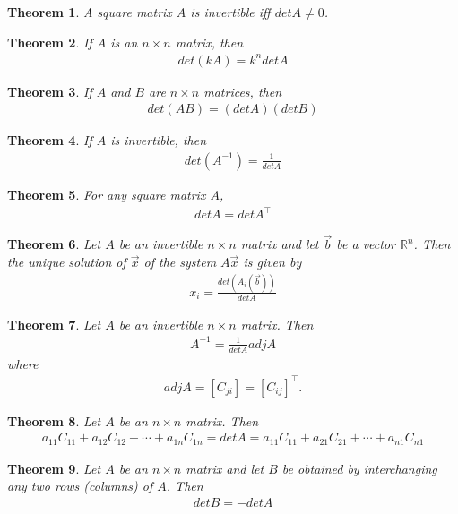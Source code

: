 \documentclass{article}
\theoremstyle{sltheorem}
\newtheorem{theorem}{Theorem}[section]
\begin{document}
\begin{theorem}
    A square matrix $A$ is invertible iff $det A \not= 0$.
\end{theorem}
\begin{theorem}
    If $A$ is an $n\times n$ matrix, then
    \begin{align*}
        det(kA) = k^n det A
    \end{align*}
\end{theorem}
\begin{theorem}
    If $A$ and $B$ are $n\times n$ matrices, then
    \begin{align*}
        det(AB) = (det A)(det B)
    \end{align*}
\end{theorem}
\begin{theorem}
    If $A$ is invertible, then
    \begin{align*}
        det(A^{-1})=\frac{1}{det A}
    \end{align*}
\end{theorem}
\begin{theorem}
    For any square matrix $A$,
    \begin{align*}
        det A = det A^\intercal
    \end{align*}
\end{theorem}
\begin{theorem}
    Let $A$ be an invertible $n\times n$ matrix and let $\vec b$ be a vector $\mathbb{R}^n$. Then the unique solution of $\vec x$ of the system $A\vec x$ is given by
    \begin{align*}
        x_i = \frac{det(A_i(\vec b))}{det A}
    \end{align*}
\end{theorem}
\begin{theorem}
    Let $A$ be an invertible $n\times n$ matrix. Then
    \begin{align*}
        A^{-1}=\frac{1}{det A}adj A
    \end{align*}
    where
    \begin{align*}
        adj A = [C_{ji}] = [C_{ij}]^\intercal.
    \end{align*}
\end{theorem}
\begin{theorem}
    Let $A$ be an $n\times n$ matrix. Then
    \begin{align*}
        a_{11}C_{11}+a_{12}C_{12}+\cdots+a_{1n}C_{1n}= det A = a_{11}C_{11}+a_{21}C_{21} + \cdots + a_{n1}C_{n1}
    \end{align*}
\end{theorem}
\begin{theorem}
    Let $A$ be an $n\times n$ matrix and let $B$ be obtained by interchanging any two rows (columns) of $A$. Then
    \begin{align*}
        det B = - det A
    \end{align*}
\end{theorem}
\end{document}
